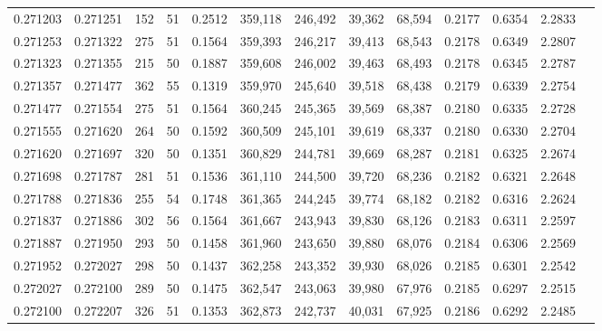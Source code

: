 \begin{tabular}{rrrrrrrrrrrrr}
0.271203 & 0.271251 &   152 &  51 &                                     0.2512 & 359,118 & 246,492 &  39,362 &  68,594 & 0.2177 & 0.6354 & 2.2833 \\
0.271253 & 0.271322 &   275 &  51 &                                     0.1564 & 359,393 & 246,217 &  39,413 &  68,543 & 0.2178 & 0.6349 & 2.2807 \\
0.271323 & 0.271355 &   215 &  50 &                                     0.1887 & 359,608 & 246,002 &  39,463 &  68,493 & 0.2178 & 0.6345 & 2.2787 \\
0.271357 & 0.271477 &   362 &  55 &                                     0.1319 & 359,970 & 245,640 &  39,518 &  68,438 & 0.2179 & 0.6339 & 2.2754 \\
0.271477 & 0.271554 &   275 &  51 &                                     0.1564 & 360,245 & 245,365 &  39,569 &  68,387 & 0.2180 & 0.6335 & 2.2728 \\
0.271555 & 0.271620 &   264 &  50 &                                     0.1592 & 360,509 & 245,101 &  39,619 &  68,337 & 0.2180 & 0.6330 & 2.2704 \\
0.271620 & 0.271697 &   320 &  50 &                                     0.1351 & 360,829 & 244,781 &  39,669 &  68,287 & 0.2181 & 0.6325 & 2.2674 \\
0.271698 & 0.271787 &   281 &  51 &                                     0.1536 & 361,110 & 244,500 &  39,720 &  68,236 & 0.2182 & 0.6321 & 2.2648 \\
0.271788 & 0.271836 &   255 &  54 &                                     0.1748 & 361,365 & 244,245 &  39,774 &  68,182 & 0.2182 & 0.6316 & 2.2624 \\
0.271837 & 0.271886 &   302 &  56 &                                     0.1564 & 361,667 & 243,943 &  39,830 &  68,126 & 0.2183 & 0.6311 & 2.2597 \\
0.271887 & 0.271950 &   293 &  50 &                                     0.1458 & 361,960 & 243,650 &  39,880 &  68,076 & 0.2184 & 0.6306 & 2.2569 \\
0.271952 & 0.272027 &   298 &  50 &                                     0.1437 & 362,258 & 243,352 &  39,930 &  68,026 & 0.2185 & 0.6301 & 2.2542 \\
0.272027 & 0.272100 &   289 &  50 &                                     0.1475 & 362,547 & 243,063 &  39,980 &  67,976 & 0.2185 & 0.6297 & 2.2515 \\
0.272100 & 0.272207 &   326 &  51 &                                     0.1353 & 362,873 & 242,737 &  40,031 &  67,925 & 0.2186 & 0.6292 & 2.2485 \\

\end{tabular}
